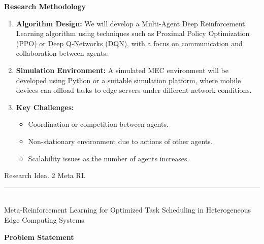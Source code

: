 \documentclass[12pt]{article}
\begin{document}
\vspace{5mm}

\noindent\textbf{\large Research Methodology}
\begin{enumerate} 
	\item \textbf{Algorithm Design:} We will develop a Multi-Agent Deep Reinforcement Learning algorithm using techniques such as Proximal Policy Optimization (PPO) or Deep Q-Networks (DQN), with a focus on communication and collaboration between agents. 
	\item \textbf{Simulation Environment:} A simulated MEC environment will be developed using Python or a suitable simulation platform, where mobile devices can offload tasks to edge servers under different network conditions.
 \item \textbf{Key Challenges:} \begin{itemize} \item Coordination or competition between agents. \item Non-stationary environment due to actions of other agents. \item Scalability issues as the number of agents increases. \end{itemize} 
\end{enumerate}



\newpage




\begin{center} 
	
	
	\vspace{-17mm}
	
	\large Research Idea. 2  \hfill Meta RL \vspace{1mm} \hrule
	
	\vspace{-1mm}
	
	
	
	\textcolor{white}{i} \\ \LARGE Meta-Reinforcement Learning for Optimized Task Scheduling in Heterogeneous Edge Computing Systems \vspace{6mm}\\
	
\end{center}


\vspace{1mm}

\noindent\textbf{\large Problem Statement}
\end{document}

